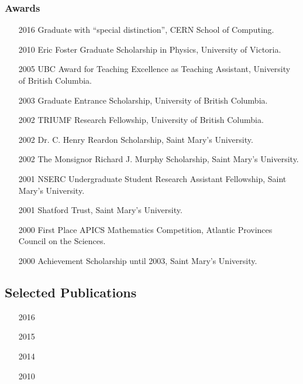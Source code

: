 \documentclass[12pt,a4paper]{article}
\begin{document}
\subsubsection*{Awards}
\begin{itemize}
	\small
	\setlength\itemsep{-0.5em}
	\item[2016]
	Graduate with ``special distinction'', CERN School of Computing.
	\item[2010]
	Eric Foster Graduate Scholarship in Physics, University of Victoria.
	\item[2005]
	UBC Award for Teaching Excellence as Teaching Assistant, University of British
	Columbia.
	\item[2003]
	Graduate Entrance Scholarship, University of British Columbia.
	\item[2002]
	TRIUMF Research Fellowship, University of British Columbia.
	\item[2002]
	Dr. C. Henry Reardon Scholarship, Saint Mary's University.
	\item[2002]
	The Monsignor Richard J. Murphy Scholarship, Saint Mary's University.
	\item[2001]
	NSERC Undergraduate Student Research Assistant Fellowship, Saint Mary's
	University.
	\item[2001]
	Shatford Trust, Saint Mary's University.
	\item[2000]
	First Place APICS Mathematics Competition, Atlantic Provinces Council on the
	Sciences.
	\item[2000]
	Achievement Scholarship until 2003, Saint Mary's University.
\end{itemize}


\subsection*{Selected Publications}
%

\begin{itemize}
  \item[2016] 
	\item[2015] 
	\item[2014] 
	\item[2010] 
\end{itemize}
\end{document}
